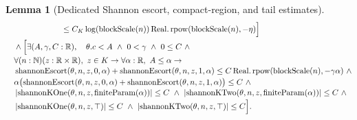 \documentclass[9pt]{extarticle}
\newtheorem{lemma}{Lemma}[section]
\theoremstyle{definition}
\theoremstyle{remark}
\newcommand{\R}{\mathbb R}
\newcommand{\N}{\mathbb N}
\newcommand{\abs}[1]{\left\lvert #1\right\rvert}
\begin{document}
\begin{lemma}[Dedicated Shannon escort, compact-region, and tail estimates]
\begin{align*}
&\hspace{24mm}\leq C_K\log(\operatorname{blockScale}(n))
  \operatorname{Real.rpow}(\operatorname{blockScale}(n),-\eta)
 \Bigr]\\
&\quad\wedge\Bigl[
 \exists(A,\gamma,C:\R),\quad
 \theta.c<A\ \wedge\ 0<\gamma\ \wedge\ 0\leq C\ \wedge\\[-2pt]
&\quad\forall(n:\N)(z:\R\times\R),\ z\in K\to
 \forall\alpha:\R,\ A\leq\alpha\to\\[-2pt]
&\quad
 \operatorname{shannonEscort}(\theta,n,z,0,\alpha)
 +\operatorname{shannonEscort}(\theta,n,z,1,\alpha)
 \leq C\operatorname{Real.rpow}
  (\operatorname{blockScale}(n),-\gamma\alpha)\ 
 \wedge\\[-2pt]
&\quad
 \alpha\bigl(\operatorname{shannonEscort}(\theta,n,z,0,\alpha)
 +\operatorname{shannonEscort}(\theta,n,z,1,\alpha)\bigr)\leq C\ 
 \wedge\\[-2pt]
&\quad
 \abs{\operatorname{shannonKOne}
  (\theta,n,z,\operatorname{finiteParam}(\alpha))}\leq C\ 
 \wedge\
 \abs{\operatorname{shannonKTwo}
  (\theta,n,z,\operatorname{finiteParam}(\alpha))}\leq C\ 
 \wedge\\[-2pt]
&\quad
 \abs{\operatorname{shannonKOne}(\theta,n,z,\top)}\leq C\ 
 \wedge\
 \abs{\operatorname{shannonKTwo}(\theta,n,z,\top)}\leq C
 \Bigr].
\end{align*}
\end{lemma}
\end{document}
